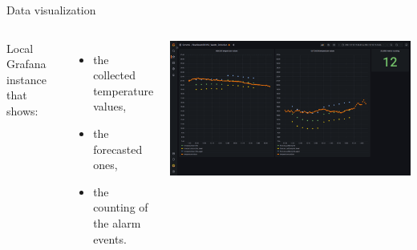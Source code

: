 \documentclass{beamer}
\begin{document}
\begin{frame}{Data visualization}

	\begin{block}

		\begin{columns}[onlytextwidth,T]
		
			\column{\dimexpr\linewidth-65mm-5mm}

			Local Grafana instance that shows:
			\begin{itemize}
				\item the collected temperature values,
				\item the forecasted ones,
				\item the counting of the alarm events.
			\end{itemize}

			\column{68mm}
			\includegraphics[scale=0.1]{figures/figure_grafana.png}

		\end{columns}
	\end{block}
\end{frame}
\end{document}
